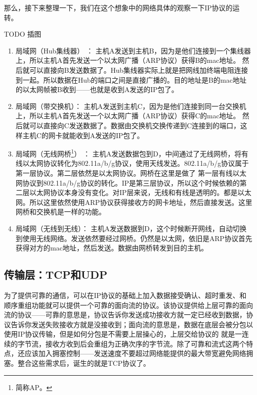 那么，接下来整理一下，我们在这个想象中的网络具体的观察一下IP协议的运转。

TODO 插图

\begin{enumerate}

\item 局域网（Hub集线器） ： 主机A发送到主机B，因为是他们连接到一个集线器上，所以主机A首先发送一个以太网广播（ARP协议）获得B的mac地址。
然后就可以直接向B发送数据了。Hub集线器实际上就是把网线加终端电阻连接到一起。所以数据在Hub的端口之间是直接广播的。目的地址是B的mac地址的以太网帧被B收到——也就是收到A发送的IP包了。

\item 局域网（带交换机）： 主机A发送到主机C，因为是他们连接到同一台交换机上，所以主机A首先发送一个以太网广播（ARP协议）获得C的mac地址。
然后就可以直接向C发送数据了。数据由交换机交换传递到C连接到的端口，这样主机C的网卡就能收到A发送的IP包了。

\item 局域网（无线网桥\footnote{简称AP。}） ： 主机A发送数据包到D，中间通过了无线网桥，将有线以太网协议转化为802.11a/b/g协议，使用天线发送。802.11a/b/g协议属于第一层协议。第二层依然是以太网协议。网桥在这里是做了
第一层有线以太网协议到802.11a/b/g协议的转化。IP是第三层协议，所以这个时候依赖的第二层以太网协议本身没有变化。对IP层来说，无线和有线是透明的。都是以太网。所以这里依然使用ARP协议获得接收方的网卡地址，然后直接发送。这里网桥和交换机是一样的功能。

\item 局域网（无线到无线）： 主机A发送数据到D，这个时候断开网线，自动切换到使用无线网络。发送依然要经过网桥。仍然是以太网，依旧是ARP协议首先获得对方的mac地址，然后发送。数据由网桥转发到目的主机。

\end{enumerate}

\subsection{传输层：TCP和UDP}
为了提供可靠的通信，可以在IP协议的基础上加入数据接受确认、超时重发、和顺序重组功能就可以提供一个可靠的面向流的协议。该协议提供给上层可靠的面向流的协议——可靠的意思是，协议告诉你发送成功接收方就一定已经收到数据，协议告诉你发送失败接收方就是没接收到；面向流的意思是，数据在底层会被分包以使用IP协议传输，但是如何分包是不需要上层操心的，上层交给协议的 就是一连续的字节流，接收方收到后会重组为正确次序的字节流。除了可靠和流式这两个特点，还应该加入拥塞控制——发送速度不要超过网络能提供的最大带宽避免网络拥塞。整合这些需求后，诞生的就是TCP协议了。

